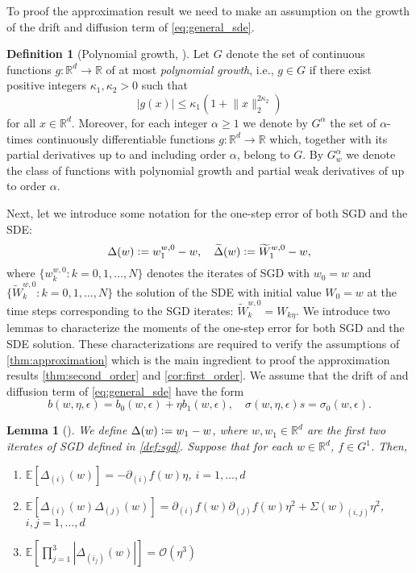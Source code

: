 \documentclass[12pt]{article}
\newtheorem{lemma}[lemma]{Lemma}
\theoremstyle{definition}
\newtheorem{definition}[definition]{Definition}
\numberwithin{equation}{section}
\newcommand{\R}{\mathbb{R}}
\newcommand{\ev}[1]{\mathbb{E}\left[{#1}\right]}
\newcommand{\norm}[1]{\lVert{#1}\rVert_2}
\newcommand{\defeq}{\vcentcolon=}
\begin{document}
To proof the approximation result we need to make an assumption on the growth of the drift and diffusion term of \eqref{eq:general_sde}. 
\begin{definition}[Polynomial growth, ]
  Let $G$ denote the set of continuous functions $g : \R^d \rightarrow \R$ of at most \emph{polynomial growth}, i.e., $g \in G$ if there exist positive integers $\kappa_1, \kappa_2 > 0$ such that
  \begin{equation*}
    |g(x)| \leq \kappa_1(1 + \norm{x}^{2\kappa_2})
  \end{equation*} 
  for all $x \in \R^d$. Moreover, for each integer $\alpha \geq 1$ we denote by $G^{\alpha}$ the set of $\alpha$-times continuously differentiable functions $g : \R^d \rightarrow \R$ which, together with its partial derivatives up to and including order $\alpha$, belong to $G$. By $G^{\alpha}_w$ we denote the class of functions with polynomial growth and partial weak derivatives of up to order $\alpha$. 
\end{definition}
Next, let we introduce some notation for the one-step error of both SGD and the SDE:
\begin{equation*}
  \Delta(w) \defeq w_{1}^{w,0} - w, \quad \widetilde{\Delta}(w) \defeq \widetilde{W}^{w,0}_1 - w,
\end{equation*}
where $\{w_k^{w,0}: k = 0,1,\dots, N\}$ denotes the iterates of SGD with $w_0 = w$ and $\{\widetilde{W}_k^{w,0}: k = 0,1,\dots, N\}$ the solution of the SDE with initial value $W_0 = w$ at the time steps corresponding to the SGD iterates: $\widetilde{W}_k^{w,0} = W_{k\eta}$.
We introduce two lemmas to characterize the moments of the one-step error for both SGD and the SDE solution. These characterizations are required to verify the assumptions of \autoref{thm:approximation} which is the main ingredient to proof the approximation results \autoref{thm:second_order} and \autoref{cor:first_order}. We assume that the drift of and diffusion term of \eqref{eq:general_sde} have the form 
\begin{equation*}
  b(w,\eta, \epsilon) = b_0(w, \epsilon) + \eta b_1(w, \epsilon), \quad \sigma(w,\eta, \epsilon) s= \sigma_0(w, \epsilon).
\end{equation*}
\begin{lemma}[]
  \label{lem:sgd_one_step}
  We define $\Delta(w) \defeq w_{1} - w$, where $w, w_{1} \in \R^d$ are the first two iterates of SGD defined in \autoref{def:sgd}. Suppose that for each $w \in \R^d$, $f \in G^1$. Then,
  \begin{enumerate}[label=(\roman*)]
    \item $\ev{\Delta_{(i)}(w)} = -\partial_{(i)} f(w) \eta$, $i = 1,\dots,d$
    \item $\ev{\Delta_{(i)}(w)\Delta_{(j)}(w)} = \partial_{(i)} f(w)\partial_{(j)} f(w) \eta^2 + \Sigma(w)_{(i,j)}\eta^2$, $i,j = 1,\dots,d$
    \item $\ev{\prod_{j=1}^3\left\lvert \Delta_{(i_j)}(w)\right\rvert} = \mathcal{O}(\eta^3)$
  \end{enumerate}
\end{lemma}
\end{document}
